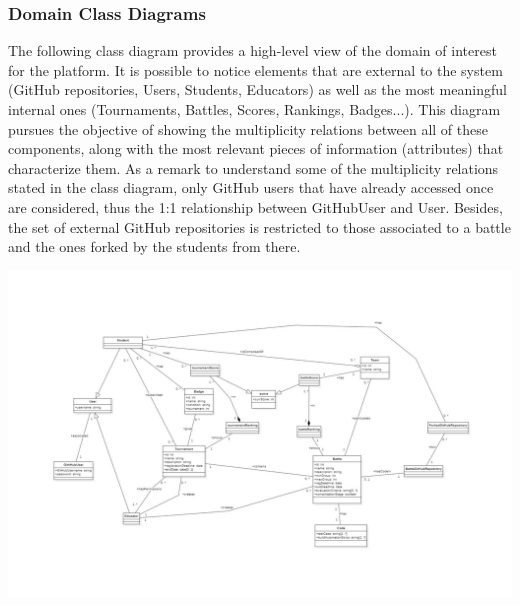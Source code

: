 
\subsubsection{Domain Class Diagrams}

The following class diagram provides a high-level view of the domain of interest for the \app platform. It is possible to notice elements that are external to the system (GitHub repositories, Users, Students, Educators) as well as the most meaningful internal ones (Tournaments, Battles, Scores, Rankings, Badges...). 
This diagram pursues the objective of showing the multiplicity relations between all of these components, along with the most relevant pieces of information (attributes) that characterize them.
As a remark to understand some of the multiplicity relations stated in the class diagram, only GitHub users that have already accessed \app once are considered, thus the 1:1 relationship between GitHubUser and User. Besides, the set of external GitHub repositories is restricted to those associated to a battle and the ones forked by the students from there.
\begin{center}
\includegraphics[angle=90,width=0.6\linewidth, scale=1.5]{2Overall_Description/res/ClassDiagram}
\end{center}


